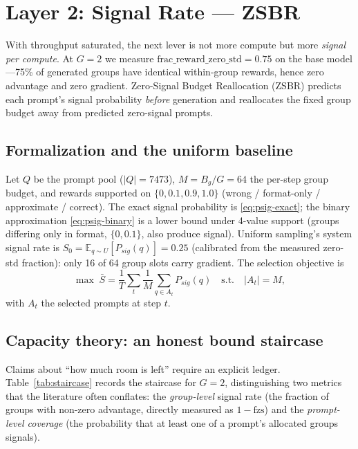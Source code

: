 \documentclass[11pt]{article}
\theoremstyle{definition}
\newcommand{\fzs}{\text{fzs}}
\begin{document}
\section{Layer 2: Signal Rate --- ZSBR}\label{sec:l2}
With throughput saturated, the next lever is not more compute but more
\emph{signal per compute}. At $G{=}2$ we measure
$\text{frac\_reward\_zero\_std}{=}0.75$ on the base model---75\% of generated
groups have identical within-group rewards, hence zero advantage and zero
gradient. Zero-Signal Budget Reallocation (ZSBR) predicts each prompt's signal
probability \emph{before} generation and reallocates the fixed group budget away
from predicted zero-signal prompts.

\subsection{Formalization and the uniform baseline}\label{sec:l2-form}
Let $Q$ be the prompt pool ($|Q|{=}7473$), $M{=}B_g/G{=}64$ the per-step group
budget, and rewards supported on $\{0,0.1,0.9,1.0\}$ (wrong / format-only /
approximate / correct). The exact signal probability is \eqref{eq:psig-exact}; the
binary approximation \eqref{eq:psig-binary} is a lower bound under 4-value
support (groups differing only in format, $\{0,0.1\}$, also produce signal).
Uniform sampling's system signal rate is $S_0=\mathbb{E}_{q\sim U}[P_{sig}(q)]
{=}0.25$ (calibrated from the measured zero-std fraction): only 16 of 64 group
slots carry gradient. The selection objective is
\begin{equation}\label{eq:zsbr-obj}
\max\; \bar S = \frac{1}{T}\sum_{t}\frac{1}{M}\sum_{q\in A_t} P_{sig}(q)
\quad \text{s.t.}\quad |A_t|=M,
\end{equation}
with $A_t$ the selected prompts at step $t$.

\subsection{Capacity theory: an honest bound staircase}\label{sec:l2-cap}
Claims about ``how much room is left'' require an explicit ledger.
Table~\ref{tab:staircase} records the staircase for $G{=}2$, distinguishing two
metrics that the literature often conflates: the \emph{group-level} signal rate
(the fraction of groups with non-zero advantage, directly measured as
$1-\fzs$) and the \emph{prompt-level coverage} (the probability that at least one
of a prompt's allocated groups signals).
\end{document}
